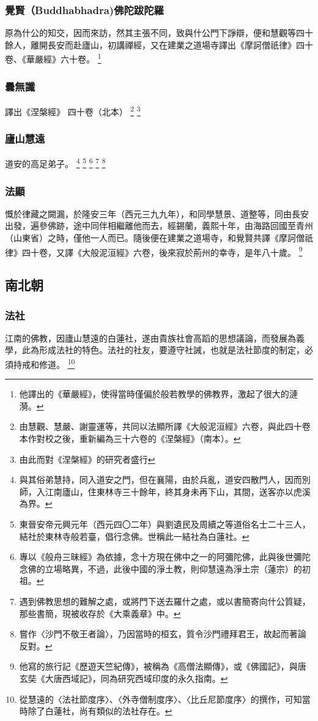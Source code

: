\subsubsection{覺賢（Buddhabhadra)佛陀跋陀羅}
原為什公的知交，因而來訪，然其主張不同，致與什公門下諍辯，便和慧觀等四十餘人，離開長安而赴廬山，初講禪經，又在建業之道場寺譯出《摩訶僧祇律》四十卷、《華嚴經》六十卷。
\footnote{他譯出的《華嚴經》，使得當時僅偏於般若教學的佛教界，激起了很大的漣漪。}
\subsubsection{曇無讖}
譯出《涅槃經》 四十卷（北本）
\footnote{由慧觀、慧嚴、謝靈運等，共同以法顯所譯《大般泥洹經》六卷，與此四十卷本作對校之後，重新編為三十六卷的《涅槃經》（南本）。}
\footnote{由此而對《涅槃經》的研究者盛行}
\subsubsection{廬山慧遠}
道安的高足弟子。
\footnote{與其俗弟慧持，同入道安之門，但在襄陽，由於兵亂，道安四散門人，因而別師，入江南廬山，住東林寺三十餘年，終其身未再下山，其間，送客亦以虎溪為界。}
\footnote{東晉安帝元興元年（西元四〇二年）與劉遺民及周續之等道俗名士二十三人，結社於東林寺般若臺，倡行念佛。世稱此一結社為白蓮社。}
\footnote{專以《般舟三昧經》為依據，念十方現在佛中之一的阿彌陀佛，此與後世彌陀念佛的立場略異，不過，此後中國的淨土教，則仰慧遠為淨土宗（蓮宗）的初祖。}
\footnote{遇到佛教思想的難解之處，或將門下送去羅什之處，或以書簡寄向什公質疑，那些書簡，現被收存於《大乘義章》中。}
\footnote{嘗作〈沙門不敬王者論〉，乃因當時的桓玄，質令沙門禮拜君王，故起而著論反對。}
\subsubsection{法顯}
慨於律藏之闕漏，於隆安三年（西元三九九年），和同學慧景、道整等，同由長安出發，遍參佛跡，途中同伴相繼離他而去，經錫蘭，義熙十年，由海路回國至青州（山東省）之時，僅他一人而已。隨後便在建業之道場寺，和覺賢共譯《摩訶僧祇律》四十卷，又譯《大般泥洹經》六卷，後來寂於荊州的幸寺，是年八十歲。
\footnote{他寫的旅行記《歷遊天竺紀傳》，被稱為《高僧法顯傳》，或《佛國記》，與唐玄奘《大唐西域記》，同為研究西域印度的永久指南。}


\subsection{南北朝}
\subsubsection{法社}
江南的佛教，因廬山慧遠的白蓮社，遂由貴族社會高蹈的思想議論，而發展為義學，此為形成法社的特色。法社的社友，要遵守社誡，也就是法社節度的制定，必須持戒和修道。
\footnote{從慧遠的〈法社節度序〉、〈外寺僧制度序〉、〈比丘尼節度序〉的撰作，可知當時除了白蓮社，尚有類似的法社存在。}
